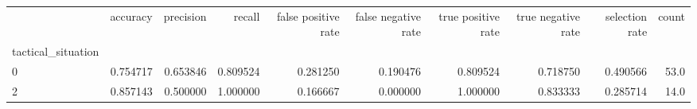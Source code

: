 \begin{tabular}{lrrrrrrrrr}
\toprule
{} &  accuracy &  precision &    recall &  false positive rate &  false negative rate &  true positive rate &  true negative rate &  selection rate &  count \\
tactical\_situation &           &            &           &                      &                      &                     &                     &                 &        \\
\midrule
0                  &  0.754717 &   0.653846 &  0.809524 &             0.281250 &             0.190476 &            0.809524 &            0.718750 &        0.490566 &   53.0 \\
2                  &  0.857143 &   0.500000 &  1.000000 &             0.166667 &             0.000000 &            1.000000 &            0.833333 &        0.285714 &   14.0 \\
\bottomrule
\end{tabular}
